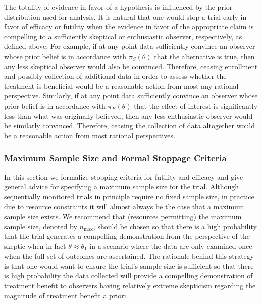 \documentclass[useAMS,usenatbib,referee]{biom}
\begin{document}
The totality of evidence in favor of a hypothesis is influenced by 
the prior distribution used for analysis.
%
It is natural that one would stop a trial early in favor of efficacy or futility when the evidence in favor of the appropriate claim is compelling
to a sufficiently skeptical or enthusiastic observer, respectively, as defined above.
%
For example, if at any point data sufficiently convince an observer whose prior belief is in accordance with $\pi_{S}(\theta)$ that 
the alternative is true, then any less skeptical observer would also be convinced. Therefore, ceasing enrollment and possibly collection 
of additional data in order to assess whether the treatment is beneficial would be a reasonable action from most any rational perspective.
%
Similarly, if at any point data sufficiently convince an observer whose prior belief is in accordance with $\pi_{E}(\theta)$ that 
the effect of interest is significantly less than what was originally believed, then any less enthusiastic observer would be similarly convinced.
Therefore, ceasing the collection of data altogether would be a reasonable action from most rational perspectives.

\subsubsection{Maximum Sample Size and Formal Stoppage Criteria}
In this section we formalize stopping criteria for futility and efficacy and give general 
advice for specifying a maximum sample size for the trial.
%
Although sequentially monitored trials in principle require no fixed sample size, in practice due to resource 
constraints it will almost always be the case that a maximum sample size exists. 
%
We recommend that (resources permitting) the maximum sample size, denoted by $n_{\text{max}}$, should be chosen so that there is a 
high probability that the trial generates a compelling demonstration from the perspective of the skeptic when in 
fact $\theta \approx \theta_1$ in a scenario where the data are only examined once when the full set of 
outcomes are ascertained.
%
The rationale behind this strategy is that one would want to ensure the trial's sample size is sufficient so that
there is high probability the data collected will provide a compelling demonstration of treatment benefit to observers 
having relatively extreme skepticism regarding the magnitude of treatment benefit a priori.  
\end{document}

